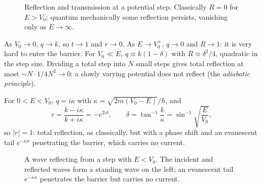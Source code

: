\begin{figure}[ht]
\centering
{}
\caption{Reflection and transmission at a potential step. Classically $R = 0$ for $E>V_0$; quantum mechanically some reflection persists, vanishing only as $E\to\infty$.}
\end{figure}

\begin{fact}
As $V_0\to0$, $q\to k$, so $t\to1$ and $r\to0$. As $E\to V_0^+$, $q\to0$ and $R\to1$: it is very hard to enter the barrier. For $V_0\ll E$, $q\approx k(1-\delta)$ with $R\approx\delta^2/4$, quadratic in the step size. Dividing a total step into $N$ small steps gives total reflection at most $\sim N\cdot1/4N^2\to0$: a slowly varying potential does not reflect (the \emph{adiabatic principle}).
\end{fact}

For $0<E<V_0$, $q = i\kappa$ with $\kappa = \sqrt{2m(V_0-E)}/\hbar$, and
\[
    r = \frac{k-i\kappa}{k+i\kappa} = -e^{2i\delta},
    \qquad
    \delta = \tan^{-1}\frac{k}{\kappa} = \sin^{-1}\sqrt{\frac{E}{V_0}},
\]
so $|r| = 1$: total reflection, as classically, but with a phase shift and an evanescent tail $e^{-\kappa x}$ penetrating the barrier, which carries no current.

\begin{figure}[ht]
\centering
{}
\caption{A wave reflecting from a step with $E<V_0$. The incident and reflected waves form a standing wave on the left; an evanescent tail $e^{-\kappa x}$ penetrates the barrier but carries no current.}
\end{figure}


